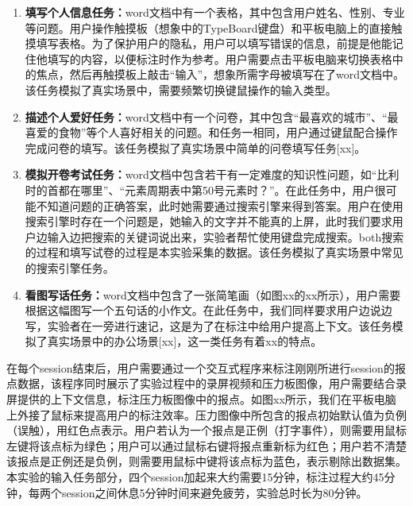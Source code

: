 \begin{enumerate}
	\item{\textbf{填写个人信息任务：}word文档中有一个表格，其中包含用户姓名、性别、专业等问题。用户操作触摸板（想象中的TypeBoard键盘）和平板电脑上的直接触摸填写表格。为了保护用户的隐私，用户可以填写错误的信息，前提是他能记住他填写的内容，以便标注时作为参考。用户需要点击平板电脑来切换表格中的焦点，然后再触摸板上敲击“输入”，想象所需字母被填写在了word文档中。该任务模拟了真实场景中，需要频繁切换键鼠操作的输入类型。}
	\item{\textbf{描述个人爱好任务：}word文档中有一个问卷，其中包含“最喜欢的城市”、“最喜爱的食物”等个人喜好相关的问题。和任务一相同，用户通过键鼠配合操作完成问卷的填写。该任务模拟了真实场景中简单的问卷填写任务[xx]。}
	\item{\textbf{模拟开卷考试任务：}word文档中包含若干有一定难度的知识性问题，如“比利时的首都在哪里”、“元素周期表中第50号元素时？”。在此任务中，用户很可能不知道问题的正确答案，此时她需要通过搜索引擎来得到答案。用户在使用搜索引擎时存在一个问题是，她输入的文字并不能真的上屏，此时我们要求用户边输入边把搜索的关键词说出来，实验者帮忙使用键盘完成搜索。both搜索的过程和填写试卷的过程是本实验采集的数据。该任务模拟了真实场景中常见的搜索引擎任务。}
	\item{\textbf{看图写话任务：}word文档中包含了一张简笔画（如图xx的xx所示），用户需要根据这幅图写一个五句话的小作文。在此任务中，我们同样要求用户边说边写，实验者在一旁进行速记，这是为了在标注中给用户提高上下文。该任务模拟了真实场景中的办公场景[xx]，这一类任务有着xx的特点。}
\end{enumerate}

在每个session结束后，用户需要通过一个交互式程序来标注刚刚所进行session的报点数据，该程序同时展示了实验过程中的录屏视频和压力板图像，用户需要结合录屏提供的上下文信息，标注压力板图像中的报点。如图xx所示，我们在平板电脑上外接了鼠标来提高用户的标注效率。压力图像中所包含的报点初始默认值为负例（误触），用红色点表示。用户若认为一个报点是正例（打字事件），则需要用鼠标左键将该点标为绿色；用户可以通过鼠标右键将报点重新标为红色；用户若不清楚该报点是正例还是负例，则需要用鼠标中键将该点标为蓝色，表示剔除出数据集。本实验的输入任务部分，四个session加起来大约需要15分钟，标注过程大约45分钟，每两个session之间休息5分钟时间来避免疲劳，实验总时长为80分钟。

